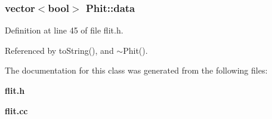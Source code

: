 \subsubsection[{data}]{\setlength{\rightskip}{0pt plus 5cm}vector$<$bool$>$ {\bf Phit::data}}\label{classPhit_de0670c9ef9f280e53ce73980b785a8c}




Definition at line 45 of file flit.h.

Referenced by toString(), and $\sim$Phit().

The documentation for this class was generated from the following files:\begin{CompactItemize}
\item 
{\bf flit.h}\item 
{\bf flit.cc}\end{CompactItemize}
